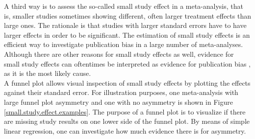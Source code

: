 \documentclass[11pt,a4paper,twoside]{book}\usepackage[]{graphicx}\usepackage[]{color}
\begin{document}
A third way is to assess the so-called small study effect in a meta-analysis, that is, smaller studies sometimes showing different, often larger treatment effects than large ones. The rationale is that studies with larger standard errors have to have larger effects in order to be significant. The estimation of small study effects is an efficient way to investigate publication bias in a large number of meta-analyses. Although there are other reasons for small study effects as well, evidence for small study effects can oftentimes be interpreted as evidence for publication bias \citep{Egger}, as it is the most likely cause. \\
% 
% 
A funnel plot \citep{funnel.plot} allows visual inspection of small study effects by plotting the effects against their standard error. For illustration purposes, one meta-analysis with large funnel plot asymmetry and one with no asymmetry is shown in Figure \ref{small.study.effect.examples}. %
The purpose of a funnel plot is to visualize if there are missing study results on one lower side of the funnel plot. By means of simple linear regression, one can investigate how much evidence there is for asymmetry. 
\end{document}
